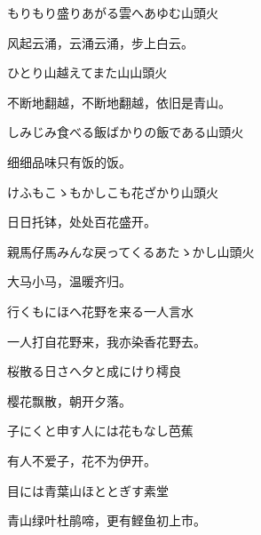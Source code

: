 \begin{haiku}
    {\FH もりもり盛りあがる雲へあゆむ}\hfill{\FH 山頭火}

    {\FK 风起云涌，云涌云涌，步上白云。}
\end{haiku}

\begin{haiku}
    {\FH ひとり山越えてまた山}\hfill{\FH 山頭火}

    {\FK 不断地翻越，不断地翻越，依旧是青山。}
\end{haiku}

\begin{haiku}
    {\FH しみじみ食べる飯ばかりの飯である}\hfill{\FH 山頭火}

    {\FK 细细品味只有饭的饭。}
\end{haiku}

\begin{haiku}
    {\FH けふもこゝもかしこも花ざかり}\hfill{\FH 山頭火}

    {\FK 日日托钵，处处百花盛开。}
\end{haiku}

\begin{haiku}
    {\FH 親馬仔馬みんな戻ってくるあたゝかし}\hfill{\FH 山頭火}

    {\FK 大马小马，温暖齐归。}
\end{haiku}

\begin{haiku}
    {\FH 行くもにほへ花野を来る一人}\hfill{\FH 言水}

    {\FK 一人打自花野来，我亦染香花野去。}
\end{haiku}

\begin{haiku}
    {\FH 桜散る日さへ夕と成にけり}\hfill{\FH 樗良}

    {\FK 樱花飘散，朝开夕落。}
\end{haiku}

\begin{haiku}
    {\FH 子にくと申す人には花もなし}\hfill{\FH 芭蕉}

    {\FK 有人不爱子，花不为伊开。}
\end{haiku}

\begin{haiku}
    {\FH 目には青葉山ほととぎす}\hfill{\FH 素堂}

    {\FK 青山绿叶杜鹃啼，更有鲣鱼初上市。}
\end{haiku}

